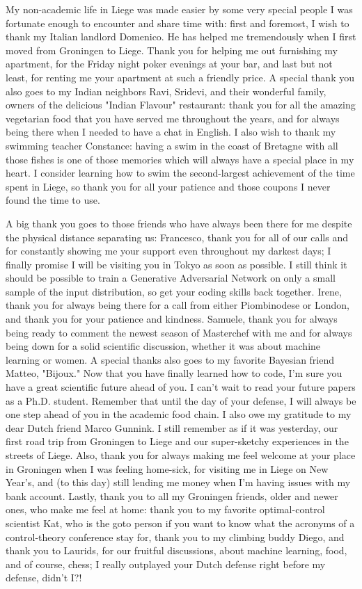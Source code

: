 My non-academic life in Liege was made easier by some very special people I was fortunate enough to encounter and share time with: first and foremost, I wish to thank my Italian landlord Domenico. He has helped me tremendously when I first moved from Groningen to Liege. Thank you for helping me out furnishing my apartment, for the Friday night poker evenings at your bar, and last but not least, for renting me your apartment at such a friendly price. A special thank you also goes to my Indian neighbors Ravi, Sridevi, and their wonderful family, owners of the delicious "Indian Flavour" restaurant: thank you for all the amazing vegetarian food that you have served me throughout the years, and for always being there when I needed to have a chat in English. I also wish to thank my swimming teacher Constance: having a swim in the coast of Bretagne with all those fishes is one of those memories which will always have a special place in my heart. I consider learning how to swim the second-largest achievement of the time spent in Liege, so thank you for all your patience and those coupons I never found the time to use.  

A big thank you goes to those friends who have always been there for me despite the physical distance separating us: Francesco, thank you for all of our calls and for constantly showing me your support even throughout my darkest days; I finally promise I will be visiting you in Tokyo as soon as possible. I still think it should be possible to train a Generative Adversarial Network on only a small sample of the input distribution, so get your coding skills back together. Irene, thank you for always being there for a call from either Piombinodese or London, and thank you for your patience and kindness. Samuele, thank you for always being ready to comment the newest season of Masterchef with me and for always being down for a solid scientific discussion, whether it was about machine learning or women. A special thanks also goes to my favorite Bayesian friend Matteo, "Bijoux." Now that you have finally learned how to code, I'm sure you have a great scientific future ahead of you. I can't wait to read your future papers as a Ph.D. student. Remember that until the day of your defense, I will always be one step ahead of you in the academic food chain. I also owe my gratitude to my dear Dutch friend Marco Gunnink. I still remember as if it was yesterday, our first road trip from Groningen to Liege and our super-sketchy experiences in the streets of Liege. Also, thank you for always making me feel welcome at your place in Groningen when I was feeling home-sick, for visiting me in Liege on New Year's, and (to this day) still lending me money when I'm having issues with my bank account. Lastly, thank you to all my Groningen friends, older and newer ones, who make me feel at home: thank you to my favorite optimal-control scientist Kat, who is the goto person if you want to know what the acronyms of a control-theory conference stay for, thank you to my climbing buddy Diego, and thank you to Laurids, for our fruitful discussions, about machine learning, food, and of course, chess; I really outplayed your Dutch defense right before my defense, didn't I?!       


